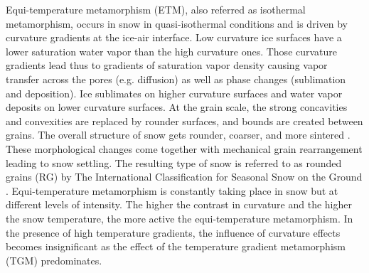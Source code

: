 \documentclass[draft,ms]{agujournal2019}
\begin{document}
Equi-temperature metamorphism (ETM), also referred as isothermal metamorphism, occurs in snow in quasi-isothermal conditions and is driven by curvature gradients at the ice-air interface. Low curvature ice surfaces have a lower saturation water vapor than the high curvature ones. Those curvature gradients lead thus to gradients of saturation vapor density causing vapor transfer across the pores (e.g. diffusion) as well as phase changes (sublimation and deposition). Ice sublimates on higher curvature surfaces and  water vapor deposits on lower curvature surfaces. At the grain scale, the strong concavities and convexities are replaced by rounder surfaces, and bounds are created between grains. The overall structure of snow gets rounder, coarser, and more sintered \cite{colbeck_thermodynamics_1980}. These morphological changes come together with mechanical grain rearrangement leading to snow settling. The resulting type of snow is referred to as rounded grains (RG) by The International Classification for Seasonal Snow on the Ground \cite{fierz2009international}. Equi-temperature metamorphism is constantly taking place in snow but at different levels of intensity. The higher the contrast in curvature and the higher the snow temperature, the more active the equi-temperature metamorphism. In the presence of high temperature gradients, the influence of curvature effects becomes insignificant as the effect of the temperature gradient metamorphism (TGM) predominates.\\
\end{document}
